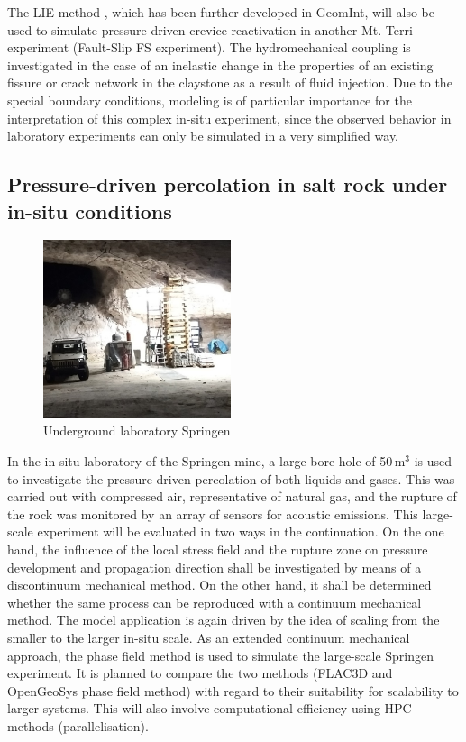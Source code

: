 The LIE method \cite{Vowinckel2020}, which has been further developed in GeomInt, will also be used to simulate pressure-driven crevice reactivation in another Mt. Terri experiment (Fault-Slip FS experiment). The hydromechanical coupling is investigated in the case of an inelastic change in the properties of an existing fissure or crack network in the claystone as a result of fluid injection. Due to the special boundary conditions, modeling is of particular importance for the interpretation of this complex in-situ experiment, since the observed behavior in laboratory experiments can only be simulated in a very simplified way.

\subsection{Pressure-driven percolation in salt rock under in-situ conditions}

\begin{figure}
\vspace{-5mm}
\includegraphics[width=0.49\textwidth]{figures/Versuch-Photo.png}
\caption{Underground laboratory Springen}
\end{figure}
In the in-situ laboratory of the Springen mine, a large bore hole of 50\,m$^3$ is used to investigate the pressure-driven percolation of both liquids and gases. This was carried out with compressed air, representative of natural gas, and the rupture of the rock was monitored by an array of sensors for acoustic emissions. This large-scale experiment will be evaluated in two ways in the continuation. On the one hand, the influence of the local stress field and the rupture zone on pressure development and propagation direction shall be investigated by means of a discontinuum mechanical method. On the other hand, it shall be determined whether the same process can be reproduced with a continuum mechanical method. The model application is again driven by the idea of scaling from the smaller to the larger in-situ scale.
As an extended continuum mechanical approach, the phase field method is used to simulate the large-scale Springen experiment. 
%
It is planned to compare the two methods (FLAC3D and OpenGeoSys phase field method) with regard to their suitability for scalability to larger systems. This will also involve computational efficiency using HPC methods (parallelisation).

